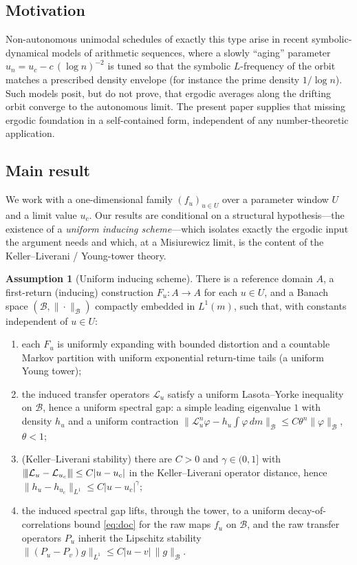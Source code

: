 \documentclass[11pt,a4paper]{article}
\newcommand{\vertiii}[1]{{\left\vert\kern-0.25ex\left\vert\kern-0.25ex\left\vert #1 \right\vert\kern-0.25ex\right\vert\kern-0.25ex\right\vert}}
\theoremstyle{definition}
\newtheorem{assumption}[theorem]{Assumption}
\begin{document}
\subsection{Motivation}

Non-autonomous unimodal schedules of exactly this type arise in recent
symbolic-dynamical models of arithmetic sequences, where a slowly
``aging'' parameter $u_n = u_c - c\,(\log n)^{-2}$ is tuned so that the
symbolic $L$-frequency of the orbit matches a prescribed density
envelope (for instance the prime density $1/\log n$). Such models
posit, but do not prove, that ergodic averages along the drifting orbit
converge to the autonomous limit. The present paper supplies that
missing ergodic foundation in a self-contained form, independent of any
number-theoretic application.

\subsection{Main result}

We work with a one-dimensional family $(f_u)_{u\in U}$ over a parameter
window $U$ and a limit value $u_c$. Our results are conditional on a
structural hypothesis---the existence of a \emph{uniform inducing
scheme}---which isolates exactly the ergodic input the argument needs
and which, at a Misiurewicz limit, is the content of the
Keller--Liverani / Young-tower theory.

\begin{assumption}[Uniform inducing scheme]
\label{ass:uis}
There is a reference domain $A$, a first-return (inducing) construction
$F_u:A\to A$ for each $u\in U$, and a Banach space
$(\mathcal{B}, \|\cdot\|_\mathcal{B})$ compactly embedded in $L^1(m)$,
such that, with constants independent of $u\in U$:
\begin{enumerate}
\item[\textup{(U1)}] each $F_u$ is uniformly expanding with bounded
distortion and a countable Markov partition with uniform exponential
return-time tails (a uniform Young tower);
\item[\textup{(U2)}] the induced transfer operators
$\mathcal{L}_u$ satisfy a uniform Lasota--Yorke inequality on
$\mathcal{B}$, hence a uniform spectral gap: a simple leading
eigenvalue $1$ with density $h_u$ and a uniform contraction
$\|\mathcal{L}_u^n\varphi - h_u\!\int\varphi\,dm\|_\mathcal{B}
\le C\theta^n\|\varphi\|_\mathcal{B}$, $\theta<1$;
\item[\textup{(U3)}] (Keller--Liverani stability) there are $C>0$ and
$\gamma\in(0,1]$ with
$\vertiii{\mathcal{L}_u - \mathcal{L}_{u_c}} \le C|u-u_c|$ in the
Keller--Liverani operator distance, hence
$\|h_u - h_{u_c}\|_{L^1}\le C|u-u_c|^\gamma$;
\item[\textup{(U4)}] the induced spectral gap lifts, through the tower,
to a uniform decay-of-correlations bound \eqref{eq:doc} for the raw
maps $f_u$ on $\mathcal{B}$, and the raw transfer operators $P_u$
inherit the Lipschitz stability
$\|(P_u-P_v)g\|_{L^1}\le C|u-v|\,\|g\|_\mathcal{B}$.
\end{enumerate}
\end{assumption}
\end{document}
